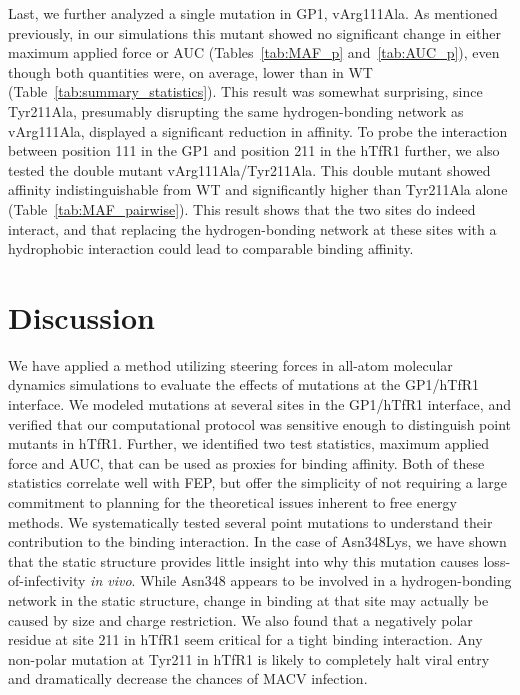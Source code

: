 \documentclass[12pt]{article}
\begin{document}
Last, we further analyzed a single mutation in GP1, vArg111Ala. As mentioned previously, in our simulations this mutant showed no significant change in either maximum applied force or AUC (Tables~\ref{tab:MAF_p} and~\ref{tab:AUC_p}), even though both quantities were, on average, lower than in WT (Table~\ref{tab:summary_statistics}). This result was somewhat surprising, since Tyr211Ala, presumably disrupting the same hydrogen-bonding network as vArg111Ala, displayed a significant reduction in affinity. To probe the interaction between position 111 in the GP1 and position 211 in the hTfR1 further, we also tested the double mutant vArg111Ala/Tyr211Ala. This double mutant showed affinity indistinguishable from WT and significantly higher than Tyr211Ala alone  (Table~\ref{tab:MAF_pairwise}). This result shows that the two sites do indeed interact, and that replacing the hydrogen-bonding network at these sites with a hydrophobic interaction could lead to comparable binding affinity.

\section{Discussion}

We have applied a method utilizing steering forces in all-atom molecular dynamics simulations to evaluate the effects of mutations at the GP1/hTfR1 interface. We modeled mutations at several sites in the GP1/hTfR1 interface, and verified that our computational protocol was sensitive enough to distinguish point mutants in hTfR1. Further, we identified two test statistics, maximum applied force and AUC, that can be used as proxies for binding affinity. Both of these statistics correlate well with FEP, but offer the simplicity of not requiring a large commitment to planning for the theoretical issues inherent to free energy methods. We systematically tested several point mutations to understand their contribution to the binding interaction. In the case of Asn348Lys, we have shown that the static structure provides little insight into why this mutation causes loss-of-infectivity \textit{in vivo}. While Asn348 appears to be involved in a hydrogen-bonding network in the static structure, change in binding at that site may actually be caused by size and charge restriction. We also found that a negatively polar residue at site 211 in hTfR1 seem critical for a tight binding interaction. Any non-polar mutation at Tyr211 in hTfR1 is likely to completely halt viral entry and dramatically decrease the chances of MACV infection.
\end{document}

